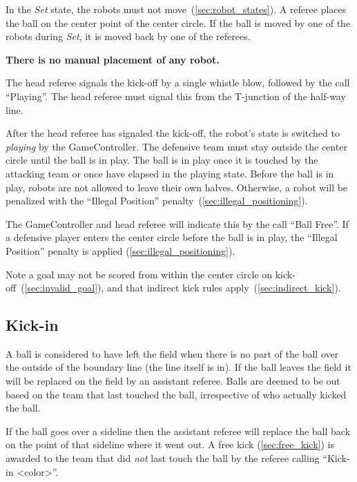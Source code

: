 In the \emph{Set} state, the robots must not move~(\cf \cref{sec:robot_states}). A referee places the ball on the center point of the center circle. If the ball is moved by one of the robots during \textit{Set}, it is moved back by one of the referees.

\textbf{There is no manual placement of any robot.}

The head referee signals the kick-off by a single whistle blow, followed by the call ``Playing''. The head referee must signal this from the T-junction of the half-way line.

After the head referee has signaled the kick-off, the robot's state is switched to \emph{playing} by the GameController.
The defensive team must stay outside the center circle until the ball is in play. The ball is in play once it is touched by the attacking team or once \emph{\KickOffBallFreeTime} have elapsed in the playing state. Before the ball is in play, robots are not allowed to leave their own halves. Otherwise, a robot will be penalized with the ``Illegal Position'' penalty~(\cf \cref{sec:illegal_positioning}).

The GameController and head referee will indicate this by the call ``Ball Free''.
If a defensive player enters the center circle before the ball is in play, the ``Illegal Position'' penalty is applied (\cf \cref{sec:illegal_positioning}).

Note a goal may not be scored from within the center circle on kick-off~(\cf \cref{sec:invalid_goal}), and that indirect kick rules apply~(\cf \cref{sec:indirect_kick}).

\subsection{Kick-in}
\label{sec:kick_in}

A ball is considered to have left the field when there is no part of the ball over the outside of the boundary line (\ie the line itself is in). If the ball leaves the field it will be replaced on the field by an assistant referee. Balls are deemed to be out based on the team that last touched the ball, irrespective of who actually kicked the ball.

If the ball goes over a sideline then the assistant referee will replace the ball back on the point of that sideline where it went out. A free kick (\cf \cref{sec:free_kick}) is awarded to the team that did \emph{not} last touch the ball by the referee calling ``Kick-in \textless color\textgreater''.

